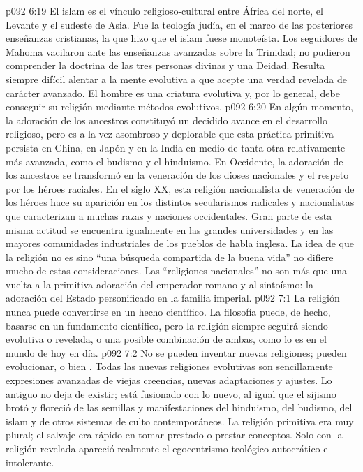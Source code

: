\vs p092 6:19 El islam es el vínculo religioso\hyp{}cultural entre África del norte, el Levante y el sudeste de Asia. Fue la teología judía, en el marco de las posteriores enseñanzas cristianas, la que hizo que el islam fuese monoteísta. Los seguidores de Mahoma vacilaron ante las enseñanzas avanzadas sobre la Trinidad; no pudieron comprender la doctrina de las tres personas divinas y una Deidad. Resulta siempre difícil alentar a la mente evolutiva a que acepte  una verdad revelada de carácter avanzado. El hombre es una criatura evolutiva y, por lo general, debe conseguir su religión mediante métodos evolutivos.
\vs p092 6:20 \pc En algún momento, la adoración de los ancestros constituyó un decidido avance en el desarrollo religioso, pero es a la vez asombroso y deplorable que esta práctica primitiva persista en China, en Japón y en la India en medio de tanta otra relativamente más avanzada, como el budismo y el hinduismo. En Occidente, la adoración de los ancestros se transformó en la veneración de los dioses nacionales y el respeto por los héroes raciales. En el siglo XX, esta religión nacionalista de veneración de los héroes hace su aparición en los distintos secularismos radicales y nacionalistas que caracterizan a muchas razas y naciones occidentales. Gran parte de esta misma actitud se encuentra igualmente en las grandes universidades y en las mayores comunidades industriales de los pueblos de habla inglesa. La idea de que la religión no es sino “una búsqueda compartida de la buena vida” no difiere mucho de estas consideraciones. Las “religiones nacionales” no son más que una vuelta a la primitiva adoración del emperador romano y al sintoísmo: la adoración del Estado personificado en la familia imperial.
\vs p092 7:1 La religión nunca puede convertirse en un hecho científico. La filosofía puede, de hecho, basarse en un fundamento científico, pero la religión siempre seguirá siendo evolutiva o revelada, o una posible combinación de ambas, como lo es en el mundo de hoy en día.
\vs p092 7:2 No se pueden inventar nuevas religiones; pueden evolucionar, o bien . Todas las nuevas religiones evolutivas son sencillamente expresiones avanzadas de viejas creencias, nuevas adaptaciones y ajustes. Lo antiguo no deja de existir; está fusionado con lo nuevo, al igual que el sijismo brotó y floreció de las semillas y manifestaciones del hinduismo, del budismo, del islam y de otros sistemas de culto contemporáneos. La religión primitiva era muy plural; el salvaje era rápido en tomar prestado o prestar conceptos. Solo con la religión revelada apareció realmente el egocentrismo teológico autocrático e intolerante.
